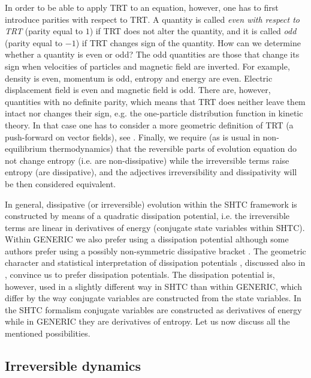 \documentclass[twoside]{article}
\begin{document}
In order to be able to apply TRT to an equation, however, one has to first 
introduce parities with respect to TRT. A quantity is called \textit{even with 
respect 
to TRT} (parity equal to $1$) if TRT does not alter the quantity, and it is 
called \textit{odd} (parity equal to $-1$) if TRT changes 
sign of the quantity. How can we determine whether a quantity is even or odd? 
The odd 
quantities are those that change its sign when velocities of particles and 
magnetic field are inverted. For example, density is even, momentum is odd, 
entropy and energy are even. Electric displacement field is even and magnetic 
field is odd. There are, however, quantities with no definite parity, which 
means that TRT does neither leave them intact nor changes their sign, e.g. the 
one-particle distribution function in kinetic theory. In that 
case one has to consider a more geometric definition of TRT (a push-forward on 
vector fields), see \cite{PRE15}. Finally, we require (as is usual in 
non-equilibrium thermodynamics) that the reversible parts of evolution equation 
do not change entropy (i.e. are non-dissipative) while the irreversible terms 
raise entropy (are dissipative), and the adjectives irreversibility and 
dissipativity will be then considered equivalent.

In general, dissipative (or irreversible) evolution within the SHTC framework 
is constructed by means of a quadratic dissipation potential, i.e. the 
irreversible terms are linear in derivatives of energy (conjugate state 
variables within SHTC). Within GENERIC we also 
prefer using a dissipation potential although some authors prefer using a 
possibly non-symmetric dissipative bracket \cite{hutter2013,Ottinger-book}. The geometric 
character and 
statistical interpretation of dissipation potentials \cite{Mielke2014}, discussed also in 
\cite{JNET-EntProdMax}, convince us to prefer dissipation potentials. The 
dissipation potential is, however, used in a 
slightly different way in SHTC than within GENERIC, which differ by the way 
conjugate variables are constructed from the state variables. In the SHTC 
formalism conjugate variables are constructed as derivatives of energy while in 
GENERIC they are derivatives of entropy. Let us now discuss all the mentioned 
possibilities.



\subsection{Irreversible dynamics}
\end{document}
